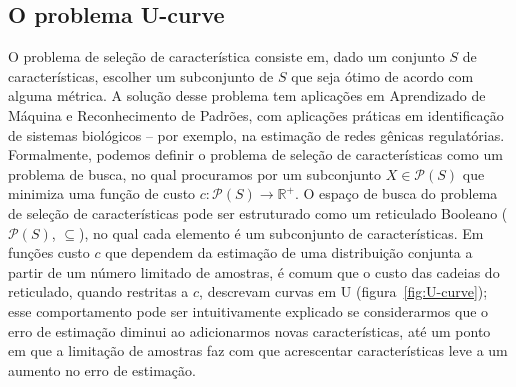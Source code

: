 \documentclass[12pt]{article}
\begin{document}
\subsection{O problema U-curve}
O problema de seleção de característica consiste em, dado um conjunto $S$
de características, escolher um subconjunto de $S$ que seja
ótimo de acordo com
alguma métrica. A solução desse problema tem aplicações em
Aprendizado de Máquina e Reconhecimento de Padrões, com aplicações práticas
em identificação de sistemas biológicos -- por exemplo, na estimação de redes
gênicas regulatórias. Formalmente, podemos 
definir o problema de seleção de características como um problema de 
busca, no qual procuramos por um subconjunto $X \in \mathcal{P}(S)$ que 
minimiza uma função de custo $c : \mathcal{P}(S) \to \mathbb{R^+}$.
O espaço de busca do problema de seleção de características pode ser
estruturado como um reticulado Booleano ($\mathcal{P}(S)$, $\subseteq$), no qual
cada elemento é um subconjunto de características. Em funções custo $c$ que dependem
da estimação de uma distribuição conjunta a partir de um número limitado de
amostras, é comum que o custo das cadeias do reticulado, quando restritas a $c$,
descrevam curvas em U (figura~\ref{fig:U-curve}); esse
comportamento pode ser intuitivamente explicado se considerarmos que o
erro de estimação diminui ao adicionarmos novas características, até um ponto
em que a limitação de amostras faz com que acrescentar características
leve a um aumento no erro de estimação.
\end{document}
